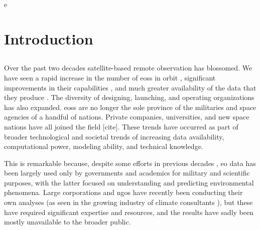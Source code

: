e%
\chapter{Introduction} \label{ch:intro}

\section{} \label{sec:questions}

Over the past two decades satellite-based remote observation has blossomed. We have seen a rapid increase in the number of \acp{eos} in orbit \cite{belwardWhoLaunchedWhat2015}, significant improvements in their capabilities \cite{jensenRemoteSensingEnvironment2006}, and much greater availability of the data that they produce \cite{borowitzOpenSpaceGlobal2017}. The diversity of designing, launching, and operating organizations has also expanded. \acp{eos} are no longer the sole province of the militaries and space agencies of a handful of nations. Private companies, universities, and new space nations have all joined the field [cite]. These trends have occurred as part of broader technological and societal trends of increasing data availability, computational power, modeling ability, and technical knowledge. 

This is remarkable because, despite some efforts in previous decades \cite{lightWarfareWelfareDefense2005}, \ac{eo} data has been largely used only by governments and academics for military and scientific purposes, with the latter focused on understanding and predicting environmental phenomena. Large corporations and \acp{ngo} have recently been conducting their own analyses (as seen in the growing industry of climate consultants \cite{cohenTop10Climate2011}), but these have required significant expertise and resources, and the results have sadly been mostly unavailable to the broader public.

